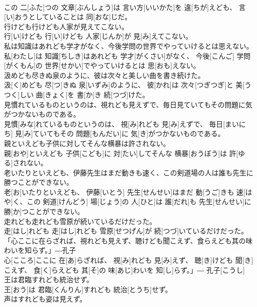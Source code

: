 \documentclass[8pt]{extreport}
\begin{document}
\begin{CJK}{UTF8}{min}
\\	この 二[ふた]つの 文章[ぶんしょう]は 言い方[いいかた]を 違[ちが]えども、 言[い]おうとしていることは 同[おな]じだ。
\\	行けども行けども人家が見えてこない。	
\\	行[い]けども 行[い]けども 人家[じんか]が 見[み]えてこない。
\\	私は知識はあれども学才がなく、今後学問の世界でやっていけるとは思えない。	
\\	私[わたし]は 知識[ちしき]はあれども 学才[がくさい]がなく、 今後[こんご] 学問[がくもん]の 世界[せかい]でやっていけるとは 思[おも]えない。
\\	汲めども尽きぬ泉のように、彼は次々と美しい曲を書き続けた。	
\\	汲[く]めども 尽[つ]きぬ 泉[いずみ]のように、 彼[かれ]は 次々[つぎつぎ]と 美[うつく]しい 曲[きょく]を 書[か]き 続[つづ]けた。
\\	見慣れているものというのは、視れども見えずで、毎日見ていてもその問題に気がつかないものである。	
\\	見慣[みな]れているものというのは、 視[み]れども 見[み]えずで、 毎日[まいにち] 見[み]ていてもその 問題[もんだい]に 気[き]がつかないものである。
\\	親といえども子供に対してそんな横暴は許されない。	
\\	親[おや]といえども 子供[こども]に 対[たい]してそんな 横暴[おうぼう]は 許[ゆる]されない。
\\	老いたりといえども、伊藤先生はまだ動きも速く、この剣道場の人は誰も先生に勝つことができない。	
\\	老[お]いたりといえども、 伊藤[いとう] 先生[せんせい]はまだ 動[うご]きも 速[はや]く、この 剣道[けんどう] 場[じょう]の 人[ひと]は 誰[だれ]も 先生[せんせい]に 勝[か]つことができない。
\\	走れども走れども雪原が続いているだけだった。	
\\	走[はし]れども 走[はし]れども 雪原[せつげん]が 続[つづ]いているだけだった。
\\	「心ここに在らざれば、視れども見えず、聴けども聞こえず、食らえども其の味わいを知らず。」―孔子	
\\	心[こころ]ここに 在[あ]らざれば、 視[み]れども 見[み]えず、 聴[き]けども 聞[き]こえず、 食[く]らえども 其[そ]の 味[あじ]わいを 知[し]らず。」― 孔子[こうし]
\\	王は君臨すれども統治せず。	
\\	王[おう]は 君臨[くんりん]すれども 統治[とうち]せず。
\\	声はすれども姿は見えず。	

\end{CJK}
\end{document}
